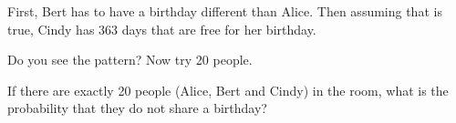 \documentclass{ximera}
\begin{document}
First, Bert has to have a birthday different than Alice. Then assuming that is true, Cindy has 363 days that are free for her birthday.
 
 
 Do you see the pattern?
 Now try 20 people.
 
 \begin{problem}
  If there are exactly 20 people (Alice, Bert and Cindy) in the room, what is the probability that they do not share a birthday?
  \begin{multipleChoice}
  \end{multipleChoice}
\end{problem}

%
\end{document}
